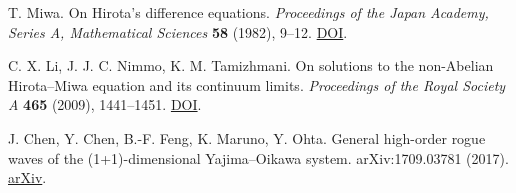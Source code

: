 \documentclass{article}
\theoremstyle{plain}
\theoremstyle{definition}
\begin{document}
\begin{enumerate}[label={[\arabic*]},leftmargin=*,itemsep=1.5pt]
\item T. Miwa. On Hirota's difference equations. \emph{Proceedings of the Japan Academy, Series A, Mathematical Sciences} \textbf{58} (1982), 9–12. \href{https://doi.org/10.3792/pjaa.58.9}{DOI}.

\item C. X. Li, J. J. C. Nimmo, K. M. Tamizhmani. On solutions to the non-Abelian Hirota–Miwa equation and its continuum limits. \emph{Proceedings of the Royal Society A} \textbf{465} (2009), 1441–1451. \href{https://doi.org/10.1098/rspa.2008.0438}{DOI}.

\item J. Chen, Y. Chen, B.-F. Feng, K. Maruno, Y. Ohta. General high-order rogue waves of the (1+1)-dimensional Yajima--Oikawa system. arXiv:1709.03781 (2017). \href{https://arxiv.org/abs/1709.03781}{arXiv}.

\end{enumerate}
 
\end{document}
